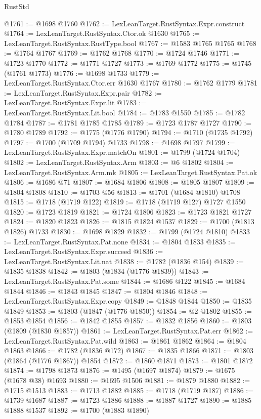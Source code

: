 \begin{lexlean}{RustStd}
\begin{coremodule}
@1761 := @1698 @1760
@1762 := LexLeanTarget.RustSyntax.Expr.construct
@1764 := LexLeanTarget.RustSyntax.Ctor.ok @1630
@1765 := LexLeanTarget.RustSyntax.RustType.bool
@1767 := @1583 @1765 @1765
@1768 := @1764 @1767
@1769 := @1762 @1768
@1770 := @1724 @1746
@1771 := @1723 @1770
@1772 := @1771 @1727
@1773 := @1769 @1772
@1775 := @1745 (@1761 @1773)
@1776 := @1698 @1733
@1779 := LexLeanTarget.RustSyntax.Ctor.err @1630 @1767
@1780 := @1762 @1779
@1781 := LexLeanTarget.RustSyntax.Expr.pair
@1782 := LexLeanTarget.RustSyntax.Expr.lit
@1783 := LexLeanTarget.RustSyntax.Lit.bool
@1784 := @1783 @1550
@1785 := @1782 @1784
@1787 := @1781 @1785 @1785
@1789 := @1723 @1787 @1727
@1790 := @1780 @1789
@1792 := @1775 (@1776 @1790)
@1794 := @1710 (@1735 @1792)
@1797 := @1700 (@1709 @1794) @1733
@1798 := @1698 @1797
@1799 := LexLeanTarget.RustSyntax.Expr.matchOn
@1801 := @1799 (@1724 @1704)
@1802 := LexLeanTarget.RustSyntax.Arm
@1803 := @6 @1802
@1804 := LexLeanTarget.RustSyntax.Arm.mk
@1805 := LexLeanTarget.RustSyntax.Pat.ok
@1806 := @1686 @71
@1807 := @1684 @1806
@1808 := @1805 @1807
@1809 := @1804 @1808
@1810 := @1703 @56
@1813 := @1701 (@1684 @1810) @1708
@1815 := @1718 (@1719 @122)
@1819 := @1718 (@1719 @127) @1727 @1550
@1820 := @1723 @1819
@1821 := @1724 @1806
@1823 := @1723 @1821 @1727
@1824 := @1820 @1823
@1826 := @1815 @1824 @1537
@1829 := @1700 (@1813 @1826) @1733
@1830 := @1698 @1829
@1832 := @1799 (@1724 @1810)
@1833 := LexLeanTarget.RustSyntax.Pat.none
@1834 := @1804 @1833
@1835 := LexLeanTarget.RustSyntax.Expr.succeed
@1836 := LexLeanTarget.RustSyntax.Lit.nat
@1838 := @1782 (@1836 @154)
@1839 := @1835 @1838
@1842 := @1803 (@1834 (@1776 @1839))
@1843 := LexLeanTarget.RustSyntax.Pat.some
@1844 := @1686 @122
@1845 := @1684 @1844
@1846 := @1843 @1845
@1847 := @1804 @1846
@1848 := LexLeanTarget.RustSyntax.Expr.copy
@1849 := @1848 @1844
@1850 := @1835 @1849
@1853 := @1803 (@1847 (@1776 @1850))
@1854 := @2 @1802
@1855 := @1853 @1854
@1856 := @1842 @1855
@1857 := @1832 @1856
@1860 := @1803 (@1809 (@1830 @1857))
@1861 := LexLeanTarget.RustSyntax.Pat.err
@1862 := LexLeanTarget.RustSyntax.Pat.wild
@1863 := @1861 @1862
@1864 := @1804 @1863
@1866 := @1782 (@1836 @172)
@1867 := @1835 @1866
@1871 := @1803 (@1864 (@1776 @1867)) @1854
@1872 := @1860 @1871
@1873 := @1801 @1872
@1874 := @1798 @1873
@1876 := @1495 (@1697 @1874)
@1879 := @1675 (@1678 @38) @1693
@1880 := @1695 @1506
@1881 := @1879 @1880
@1882 := @1715 @1513
@1883 := @1713 @1882
@1885 := @1718 (@1719 @187)
@1886 := @1739 @1687
@1887 := @1723 @1886
@1888 := @1887 @1727
@1890 := @1885 @1888 @1537
@1892 := @1700 (@1883 @1890)

\end{coremodule}
\end{lexlean}
